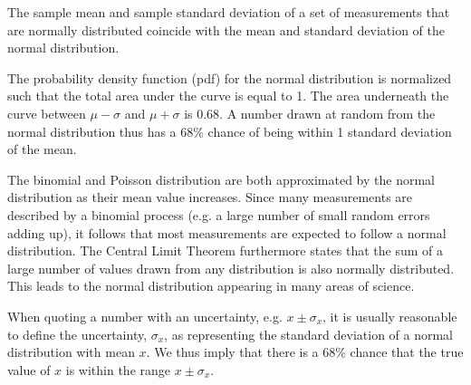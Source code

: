 The sample mean and sample standard deviation of a set of measurements that are normally distributed coincide with the mean and standard deviation of the normal distribution.  

The probability density function (pdf) for the normal distribution is normalized such that the total area under the curve is equal to 1. The area underneath the curve between $\mu-\sigma$ and $\mu+\sigma$ is 0.68. A number drawn at random from the normal distribution thus has a 68\% chance of being within 1 standard deviation of the mean. 

The binomial and Poisson distribution are both approximated by the normal distribution as their mean value increases. Since many measurements are described by a binomial process (e.g. a large number of small random errors adding up), it follows that most measurements are expected to follow a normal distribution. The Central Limit Theorem furthermore states that the sum of a large number of values drawn from any distribution is also normally distributed. This leads to the normal distribution appearing in many areas of science.

When quoting a number with an uncertainty, e.g. $x\pm\sigma_x$, it is usually reasonable to define the uncertainty, $\sigma_x$, as representing the standard deviation of a normal distribution with mean $x$. We thus imply that there is a 68\% chance that the true value of $x$ is within the range $x\pm\sigma_x$.

